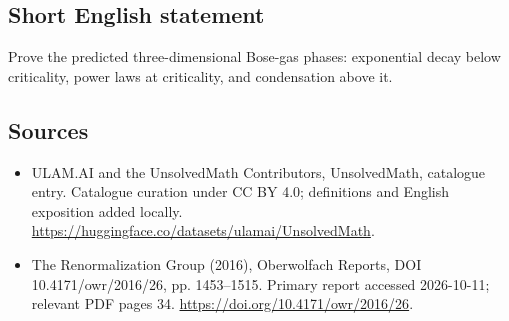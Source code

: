 \documentclass[11pt]{article}
\begin{document}
\subsection{Short English statement}
Prove the predicted three-dimensional Bose-gas phases: exponential decay below criticality, power laws at criticality, and condensation above it.
\subsection{Sources}
\begin{itemize}
\item[\hypertarget{source:statement:1}{S1}] ULAM.AI and the UnsolvedMath Contributors, UnsolvedMath, catalogue entry. Catalogue curation under CC BY 4.0; definitions and English exposition added locally.
\url{https://huggingface.co/datasets/ulamai/UnsolvedMath}.
\item[\hypertarget{source:statement:2}{S2}] The Renormalization Group (2016), Oberwolfach Reports, DOI 10.4171/owr/2016/26, pp. 1453--1515. Primary report accessed 2026-10-11; relevant PDF pages 34.
\url{https://doi.org/10.4171/owr/2016/26}.
\end{itemize}
\label{end:statement}
\end{document}
